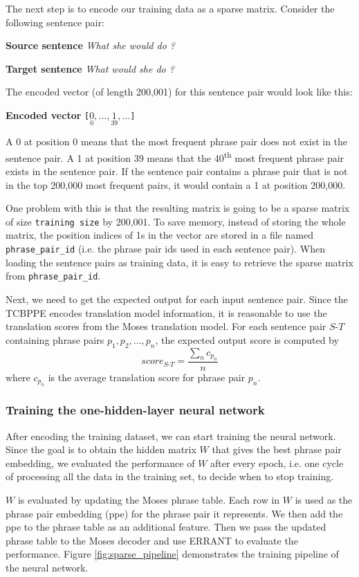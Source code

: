 \documentclass[12pt,a4paper,twoside,openright]{report}
\begin{document}
The next step is to encode our training data as a sparse matrix. Consider the following sentence pair:

\textbf{Source sentence}
\textit{What she would do ?}

\textbf{Target sentence}
\textit{What would she do ?}

The encoded vector (of length 200,001) for this sentence pair would look like this:

\textbf{Encoded vector}
\texttt{[$\underset{0}{0}, \ldots, \underset{39}{1}, \ldots$]}

A 0 at position 0 means that the most frequent phrase pair does not exist in the sentence pair. A 1 at position 39 means that the 40\textsuperscript{th} most frequent phrase pair exists in the sentence pair. If the sentence pair contains a phrase pair that is not in the top 200,000 most frequent pairs, it would contain a 1 at position 200,000.

One problem with this is that the resulting matrix is going to be a sparse matrix of size \texttt{training size} by 200,001. To save memory, instead of storing the whole matrix, the position indices of 1s in the vector are stored in a file named \texttt{phrase\_pair\_id} (i.e. the phrase pair ids used in each sentence pair). When loading the sentence pairs as training data, it is easy to retrieve the sparse matrix from \texttt{phrase\_pair\_id}.

Next, we need to get the expected output for each input sentence pair. Since the TCBPPE encodes translation model information, it is reasonable to use the translation scores from the Moses translation model. For each sentence pair $S\textrm{-}T$ containing phrase pairs $p_1, p_2, ..., p_n$, the expected output score is computed by
\[ score_{S\textrm{-}T} = \frac{\sum_n c_{p_n}}{n} \]
where $c_{p_n}$ is the average translation score for phrase pair $p_n$.

\subsubsection{Training the one-hidden-layer neural network}
After encoding the training dataset, we can start training the neural network. Since the goal is to obtain the hidden matrix $W$ that gives the best phrase pair embedding, we evaluated the performance of $W$ after every epoch, i.e. one cycle of processing all the data in the training set, to decide when to stop training.

$W$ is evaluated by updating the Moses phrase table. Each row in $W$ is used as the phrase pair embedding (ppe) for the phrase pair it represents. We then add the ppe to the phrase table as an additional feature. Then we pass the updated phrase table to the Moses decoder and use ERRANT to evaluate the performance. Figure \ref{fig:sparse_pipeline} demonstrates the training pipeline of the neural network.
\end{document}
